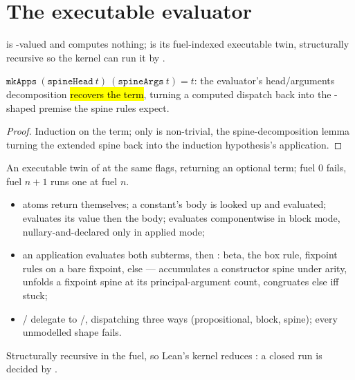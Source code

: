 \section{The executable evaluator}
\label{sec:lambdabox:compute}

\WcbvEval{} is -valued and computes nothing;  is its fuel-indexed executable twin, structurally recursive so the kernel can run it by .

\begin{lemma}
\label{lem:LBTerm-mkApps_spine}
\leanok
{}
 $\mathtt{mkApps}\ (\mathtt{spineHead}\ t)\ (\mathtt{spineArgs}\ t) = t$: the evaluator's head/arguments decomposition \hl{recovers the term}, turning a computed dispatch back into the -shaped premise the spine rules expect.
\end{lemma}
\begin{proof}
\leanok
{}
 Induction on the term; only  is non-trivial, the spine-decomposition lemma turning the extended spine back into the induction hypothesis's application.
\end{proof}

\begin{definition}
\label{def:lbEval}
\leanok
{}
 An executable twin of \WcbvEval{} at the same flags, returning an optional term; fuel $0$ fails, fuel $n+1$ runs one  at fuel $n$.
\begin{itemize}
\item atoms return themselves; a constant's body is looked up and evaluated;  evaluates its value then the body;  evaluates componentwise in block mode, nullary-and-declared only in applied mode;
\item an application evaluates both subterms, then : beta, the box rule, fixpoint rules on a bare fixpoint, else  --- accumulates a constructor spine under arity, unfolds a fixpoint spine at its principal-argument count, congruates else iff stuck;
\item {}/ delegate to /, dispatching three ways (propositional, block, spine); every unmodelled shape fails.
\end{itemize}
 Structurally recursive in the fuel, so Lean's kernel reduces : a closed run is decided by .
\end{definition}

